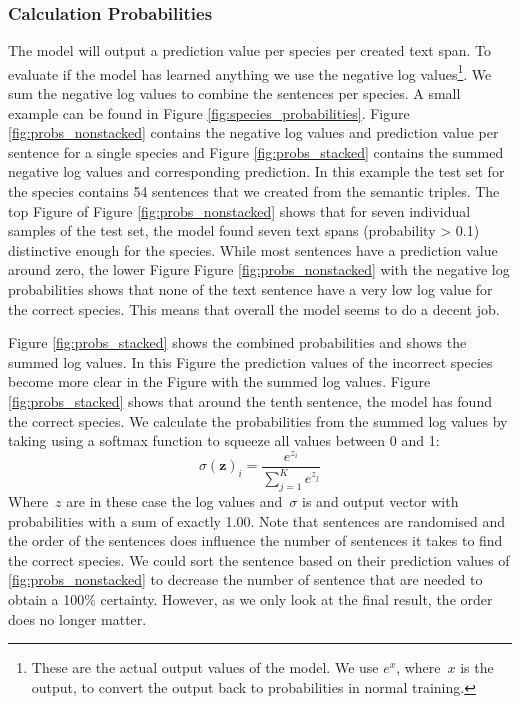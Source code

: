 \documentclass[a4paper, 12pt, oneside]{book} %
\begin{document}
\subsubsection{Calculation Probabilities}
The model will output a prediction value per species per created text span.
To evaluate if the model has learned anything we use the negative log values\footnote{These are the actual output values of the model. We use \(e^{x}\), where~$x$ is the output, to convert the output back to probabilities in normal training. }. 
We sum the negative log values to combine the sentences per species. 
A small example can be found in Figure \ref{fig:species_probabilities}.
Figure \ref{fig:probs_nonstacked} contains the negative log values and prediction value per sentence for a single species and Figure \ref{fig:probs_stacked} contains the summed negative log values and corresponding prediction.
In this example the test set for the species contains 54 sentences that we created from the semantic triples.
The top Figure of Figure \ref{fig:probs_nonstacked} shows that for seven individual samples of the test set, the model found seven text spans (probability > 0.1) distinctive enough for the species.
While most sentences have a prediction value around zero, the lower Figure Figure \ref{fig:probs_nonstacked} with the negative log probabilities shows that none of the text sentence have a very low log value for the correct species.
This means that overall the model seems to do a decent job.

Figure \ref{fig:probs_stacked} shows the combined probabilities and shows the summed log values.
In this Figure the prediction values of the incorrect species become more clear in the Figure with the summed log values.
Figure \ref{fig:probs_stacked} shows that around the tenth sentence, the model has found the correct species.
We calculate the probabilities from the summed log values by taking using a softmax function to squeeze all values between 0 and 1:
\begin{equation} \label{eq:softmax}
    \sigma(\mathbf{z})_i = \frac{e^{z_i}}{\sum_{j=1}^K e^{z_j}}
\end{equation}
Where~$z$ are in these case the log values and~$\sigma$ is and output vector with probabilities with a sum of exactly 1.00.
Note that sentences are randomised and the order of the sentences does influence the number of sentences it takes to find the correct species.
We could sort the sentence based on their prediction values of \ref{fig:probs_nonstacked} to decrease the number of sentence that are needed to obtain a 100\% certainty.
However, as we only look at the final result, the order does no longer matter.
\end{document}
